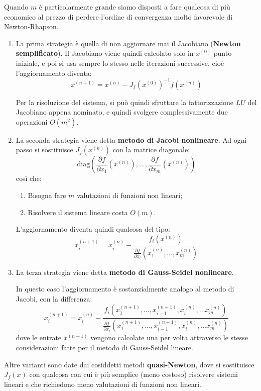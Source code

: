 \documentclass[a4paper,11pt]{article}
\begin{document}
Quando $m$ è particolarmente grande siamo disposti a fare qualcosa di più economico al prezzo di perdere l'ordine di convergenza molto favorevole di Newton-Rhapson.

\begin{enumerate}
	\item La prima strategia è quella di non aggiornare mai il Jacobiano (\textbf{Newton semplificato}).
		Il Jacobiano viene quindi calcolato solo in $x^{(0)}$ punto iniziale, e poi si usa sempre lo stesso nelle iterazioni successive, cioè l'aggiornamento diventa:
		$$
		x^{(n + 1)} = x^{(n)} - J_f(x^{(0)})^{-1} f(x^{(n)})
		$$
		
		Per la risoluzione del sistema, si può quindi sfruttare la fattorizzazione $LU$ del Jacobiano appena nominato, e quindi svolgere complessivamente due operazioni $O(m^2)$.

	\item La seconda strategia viene detta \textbf{metodo di Jacobi nonlineare}.
		Ad ogni passo si sostituisce $J_f(x^{(n)})$ con la matrice diagonale:
		$$
		\mathrm{diag} \left( \frac{\partial f}{\partial x_1} (x^{(n)}), ..., \frac{\partial f}{\partial x_m} (x^{(n)}) \right)
		$$
		così che:
		\begin{enumerate}
			\item Bisogna fare $m$ valutazioni di funzioni non lineari;
			\item Risolvere il sistema lineare costa $O(m)$.
		\end{enumerate}

		L'aggiornamento diventa quindi qualcosa del tipo:
		$$
		x_i^{(n + 1)} = x_i^{(n)} - \frac{f_i(x^{(n)})}{\frac{\partial f}{\partial x_i} (x_1^{(n)}, ..., x_m^{(n)})}
		$$

	\item La terza strategia viene detta \textbf{metodo di Gauss-Seidel nonlineare}.

		In questo caso l'aggiornamento è sostanzialmente analogo al metodo di Jacobi, con la differenza:
		$$
		x_i^{(n + 1)} = x_i^{(n)} - \frac{f_i(x_1^{(n + 1)}, ..., x_{i - 1}^{(n + 1)}, x_i^{(n)}, ... x_m^{(n)})}{\frac{\partial f}{\partial x_i} (x_1^{(n + 1)}, ..., x_{i - 1}^{(n + 1)}, x_i^{(n)}, ... x_m^{(n)})}
		$$
		dove le entrate $x^{(n + 1)}$ vengono calcolate una per volta attraverso le stesse considerazioni fatte per il metodo di Gauss-Seidel lineare.
\end{enumerate}

Altre varianti sono date dai cosiddetti metodi \textbf{quasi-Newton}, dove si sostituisce $J_f(x)$ con qualcosa con cui è più semplice (meno costoso) risolvere sistemi lineari e che richiedono meno valutazioni di funzioni non lineari.
\end{document}
